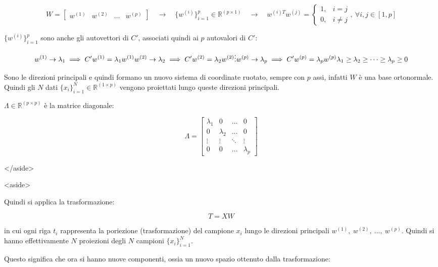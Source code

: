 $$
W=\begin{bmatrix}
	w^{(1)} & w^{(2)} & \dots &w^{(p)}
\end{bmatrix} \quad\rightarrow\quad \Big\{w^{(i)}\Big\}_{i=1}^p\in\mathbb{R}^{(p\times 1)} \quad\rightarrow\quad w^{(i)T}w^{(j)}=\begin{cases}
	1, &i=j\\
	0, & i\ne j
\end{cases},\ \forall i,j\in[1,p]
$$

$\{w^{(i)}\}_{i=1}^p$ sono anche gli autovettori di $C'$, associati quindi ai $p$ autovalori di $C'$:

$$
w^{(1)}\rightarrow\lambda_1\implies C'w^{(1)}=\lambda_1w^{(1)}\\
w^{(2)}\rightarrow\lambda_2\implies C'w^{(2)}=\lambda_2w^{(2)}\\
\vdots\\
w^{(p)}\rightarrow\lambda_p\implies C'w^{(p)}=\lambda_pw^{(p)}\\[.3cm]

\lambda_1 \ge \lambda_2 \ge \dots \ge \lambda_p \ge 0
$$

Sono le direzioni principali e quindi formano un nuovo sistema di coordinate ruotato, sempre con $p$ assi, infatti $W$ è una base ortonormale. Quindi gli $N$ dati $\{x_i\}_{i=1}^N\in\mathbb{R}^{(1\times p)}$ vengono proiettati lungo queste direzioni principali.

$\Lambda\in\mathbb{R}^{(p\times p)}$ è la matrice diagonale:

$$
\Lambda=\begin{bmatrix}
	\lambda_1 & 0 & \dots & 0 \\
	0 & \lambda_2 & \dots & 0\\
	\vdots & \vdots & \ddots & \vdots \\
	0 & 0 & \dots & \lambda_p
\end{bmatrix}
$$

</aside>

<aside>


Quindi si applica la trasformazione:

$$
T=XW
$$

in cui ogni riga $t_i$ rappresenta la poriezione (trasformazione) del campione $x_i$ lungo le direzioni principali $w^{(1)},\ w^{(2)},\ ...,\ w^{(p)}$. Quindi si hanno effettivamente $N$ proiezioni degli $N$ campioni $\{x_i\}_{i=1}^N$.

Questo significa che ora si hanno nuove componenti, ossia un nuovo spazio ottenuto dalla trasformazione:

